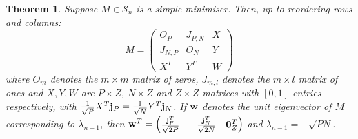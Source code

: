 \documentclass[10pt,a4paper]{amsart}
\newtheorem{thm}{Theorem}
\begin{document}
\begin{thm} \label{lambda_n<lambda_n-1} Suppose $M\in \mathcal{S}_n$ is a simple minimiser. Then, up to reordering rows and columns:
\begin{equation*}
    M = \begin{pmatrix} O_{P} & J_{P,N} & X \\ J_{N,P} & O_{N} & Y \\ X^T & Y^T & W
        \end{pmatrix}
\end{equation*}
where $O_m$ denotes the $m\times m$ matrix of zeros, $J_{m,l}$ denotes the $m\times l$ matrix of ones and $X,Y,W$ are $P\times Z$, $N\times Z$ and $Z\times Z$ matrices with $[0,1]$ entries respectively, with $\frac{1}{\sqrt{P}}X^T\bold{j}_P = \frac{1}{\sqrt{N}}Y^T\bold{j}_N$. If $\bold{w}$ denotes the unit eigenvector of $M$ corresponding to $\lambda_{n-1}$, then $\bold{w}^T = \begin{pmatrix} \frac{\bold{j}_P^T}{\sqrt{2P}} & -\frac{\bold{j}_N^T}{\sqrt{2N}} & \bold{0}_{Z}^T \end{pmatrix}$ and $\lambda_{n-1} = -\sqrt{PN}$.
\end{thm}
\end{document}
